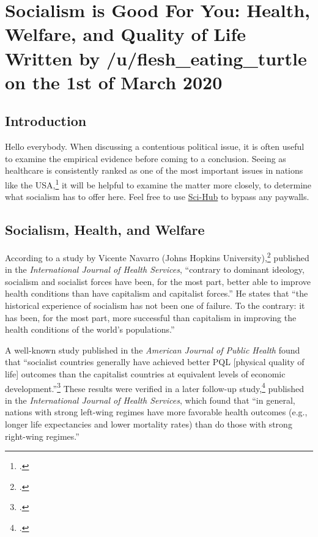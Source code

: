 \section[Socialism is Good For You]{Socialism is Good For You: Health, Welfare, and Quality of Life\\\small{Written by /u/flesh\_eating\_turtle on the 1st of March 2020}}
\subsection*{Introduction}

Hello everybody.
When discussing a contentious political issue, it is often useful to examine the empirical evidence before coming to a conclusion.
Seeing as healthcare is consistently ranked as one of the most important issues in nations like the USA,\footcite{hyrn-issues} it will be helpful to examine the matter more closely, to determine what socialism has to offer here.
Feel free to use \href{https://scihub.bban.top/}{Sci-Hub} to bypass any paywalls.

\subsection*{Socialism, Health, and Welfare}

According to a study by Vicente Navarro (Johns Hopkins University),\footcite{navarro-socialism} published in the \textit{International Journal of Health Services}, ``contrary to dominant ideology, socialism and socialist forces have been, for the most part, better able to improve health conditions than have capitalism and capitalist forces.''
He states that ``the historical experience of socialism has not been one of failure.
To the contrary: it has been, for the most part, more successful than capitalism in improving the health conditions of the world's populations.''

A well-known study published in the \textit{American Journal of Public Health} found that ``socialist countries generally have achieved better PQL [physical quality of life] outcomes than the capitalist countries at equivalent levels of economic development.''\footcite{cereseto-economic}
These results were verified in a later follow-up study,\footcite{lena-political} published in the \textit{International Journal of Health Services}, which found that ``in general, nations with strong left-wing regimes have more favorable health outcomes (e.g., longer life expectancies and lower mortality rates) than do those with strong right-wing regimes.''

